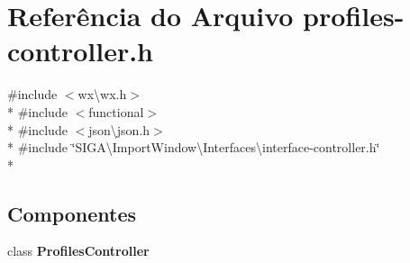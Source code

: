\section{Referência do Arquivo profiles-\/controller.h}
\label{profiles-controller_8h}
{\ttfamily \#include $<$wx\textbackslash{}wx.\+h$>$}\\*
{\ttfamily \#include $<$functional$>$}\\*
{\ttfamily \#include $<$json\textbackslash{}json.\+h$>$}\\*
{\ttfamily \#include \char`\"{}S\+I\+G\+A\textbackslash{}\+Import\+Window\textbackslash{}\+Interfaces\textbackslash{}interface-\/controller.\+h\char`\"{}}\\*
\subsection*{Componentes}
\begin{DoxyCompactItemize}
\item 
class {\bf Profiles\+Controller}
\end{DoxyCompactItemize}
